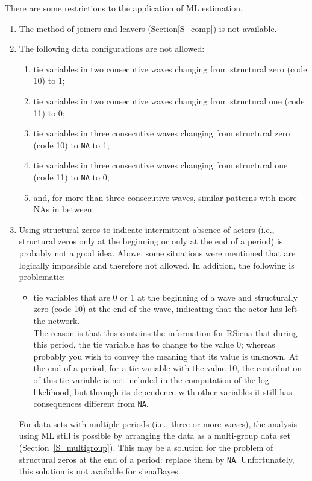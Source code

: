 \documentclass[a4paper,fleqn,11pt]{article}
\newcommand{\+}{\, + \,}
\newcommand{\sfn}[1]{\textsf{#1}}
\newcommand{\RS}{{\sf RSiena }}
\begin{document}
There are some restrictions to the application of ML estimation.
\begin{enumerate}
  \item The method of joiners and leavers (Section\ref{S_comp})
is not available.
  \item The following data configurations are not allowed:
\begin{enumerate}
\item tie variables in two consecutive waves changing from
    structural zero (code 10) to 1;
\item tie variables in two consecutive waves changing from
    structural one (code 11) to 0;
\item tie variables in three consecutive waves changing from
    structural zero (code 10) to \texttt{NA} to 1;
\item tie variables in three consecutive waves changing from
    structural one (code 11) to \texttt{NA} to 0;
\item and, for more than three consecutive waves, similar patterns
    with more NAs in between.
\end{enumerate}
\item Using structural zeros to indicate intermittent absence of actors
    (i.e., structural zeros only at the beginning or only at the end
    of a period)   is probably not a good idea.
     Above, some situations were mentioned that are logically impossible
     and therefore not allowed.
     In addition, the following is problematic:
\begin{itemize}
\item tie variables that are 0 or 1 at the beginning of a wave and
      structurally zero (code 10) at the end of the wave,
      indicating that the actor has left the network.\\
      The reason is that this contains the information for \RS that during
      this period, the tie variable has to change to the value 0;
      whereas probably you wish to convey the meaning that its value
      is unknown. At the end of a period, for a tie variable with
      the value 10, the contribution of this tie variable is not included
      in the computation of the log-likelihood,
      but through its dependence with other
      variables it still has consequences different from \texttt{NA}.
\end{itemize}
For data sets with multiple periods (i.e., three or more waves), the
analysis using ML still is possible by arranging the data
as a multi-group data set (Section~\ref{S_multigroup}).
This may be a solution for the problem of structural zeros at the end
of a period: replace them by \texttt{NA}.
Unfortunately, this solution is not available for
\sfn{sienaBayes}.
\end{enumerate}
\end{document}
